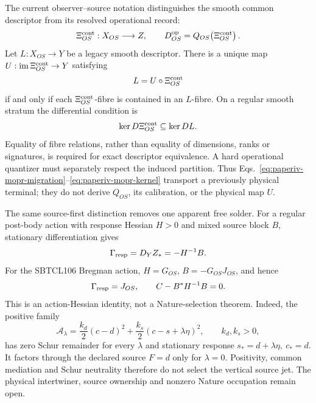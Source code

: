 \documentclass[11pt]{article}
\begin{document}
The current observer--source notation distinguishes the smooth common
descriptor from its resolved operational record:
\begin{equation}
 \Xi^{\rm cont}_{OS}:X_{OS}\longrightarrow Z,
 \qquad
 D^{\rm op}_{OS}=Q_{OS}\!\left(\Xi^{\rm cont}_{OS}\right).
 \label{eq:paperiv-continuous-operational-readout}
\end{equation}
Let \(L:X_{OS}\to Y\) be a legacy smooth descriptor.  There is a unique map
\(U:\operatorname{im}\Xi^{\rm cont}_{OS}\to Y\) satisfying
\begin{equation}
 L=U\circ\Xi^{\rm cont}_{OS}
 \label{eq:paperiv-mopr-migration}
\end{equation}
if and only if each \(\Xi^{\rm cont}_{OS}\)-fibre is contained in an
\(L\)-fibre.  On a regular smooth stratum the differential condition is
\begin{equation}
 \ker D\Xi^{\rm cont}_{OS}\subseteq\ker DL.
 \label{eq:paperiv-mopr-kernel}
\end{equation}
Equality of fibre relations, rather than equality of dimensions, ranks or
signatures, is required for exact descriptor equivalence.  A hard operational
quantizer must separately respect the induced partition.  Thus
Eqs.~\eqref{eq:paperiv-mopr-migration}--\eqref{eq:paperiv-mopr-kernel}
transport a previously physical terminal; they do not derive \(Q_{OS}\), its
calibration, or the physical map \(U\).

The same source-first distinction removes one apparent free solder.  For a
regular post-body action with response Hessian \(H>0\) and mixed source block
\(B\), stationary differentiation gives
\begin{equation}
 \Gamma_{\rm resp}=D_YZ_*=-H^{-1}B.
 \label{eq:paperiv-mixed-hessian-solder}
\end{equation}
For the SBTCL106 Bregman action, \(H=G_{OS}\),
\(B=-G_{OS}J_{OS}\), and hence
\begin{equation}
 \Gamma_{\rm resp}=J_{OS},\qquad
 C-B^*H^{-1}B=0.
 \label{eq:paperiv-sbtcl106-solder}
\end{equation}
This is an action-Hessian identity, not a Nature-selection theorem.  Indeed,
the positive family
\begin{equation}
 \mathcal A_\lambda=\frac{k_d}{2}(c-d)^2
  +\frac{k_s}{2}(c-s+\lambda\eta)^2,
 \qquad k_d,k_s>0,
 \label{eq:paperiv-solder-counterfamily}
\end{equation}
has zero Schur remainder for every \(\lambda\) and stationary response
\(s_*=d+\lambda\eta,\ c_*=d\).  It factors through the declared source
\(F=d\) only for \(\lambda=0\).  Positivity, common mediation and Schur
neutrality therefore do not select the vertical source jet.  The physical
intertwiner, source ownership and nonzero Nature occupation remain open.
\end{document}
